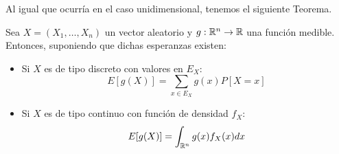 Al igual que ocurría en el caso unidimensional, tenemos el siguiente Teorema.
\begin{teo}
    Sea $X=(X_1,\dots,X_n)$ un vector aleatorio y $g:\mathbb{R}^n\to \mathbb{R}$ una función medible. Entonces, suponiendo que dichas esperanzas existen:
    \begin{itemize}
        \item Si $X$ es de tipo discreto con valores en $E_X$:
        \begin{equation*}
            E[g(X)] = \sum_{x\in E_X}g(x)P[X=x]
        \end{equation*}

        \item Si $X$ es de tipo continuo con función de densidad $f_X$:
        \begin{equation*}
            E[g(X)] = \int_{\mathbb{R}^n} g(x)f_X(x) dx
        \end{equation*}
    \end{itemize}
\end{teo}

